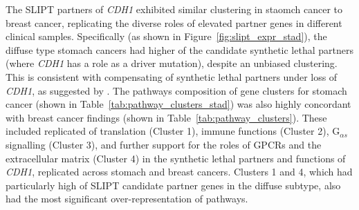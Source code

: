 The \gls{SLIPT} partners of \textit{CDH1} exhibited similar clustering in staomch cancer to breast cancer, replicating the diverse roles of elevated partner genes in different clinical samples. Specifically (as shown in Figure~\ref{fig:slipt_expr_stad}), the diffuse type stomach cancers had higher  of the candidate \gls{synthetic lethal} partners (where \textit{CDH1} has a role as a \gls{driver mutation}), despite an unbiased clustering. This is consistent with compensating  of \gls{synthetic lethal} partners under loss of \textit{CDH1}, as suggested by \citet{Lu2015}. The \glspl{pathway} composition of gene clusters for stomach cancer (shown in Table~\ref{tab:pathway_clusters_stad}) was also highly concordant with breast cancer findings (shown in Table~\ref{tab:pathway_clusters}). These included replicated of translation (Cluster 1), immune functions (Cluster 2), G$_{\alpha s}$ signalling (Cluster 3), and further support for the roles of \glspl{GPCR} and the extracellular matrix (Cluster 4) in the \gls{synthetic lethal} partners and functions of \textit{CDH1}, replicated across stomach and breast cancers. Clusters 1 and 4, which had particularly high  of \gls{SLIPT} candidate partner genes in the diffuse subtype, also had the most significant over-representation of \glspl{pathway}.

\FloatBarrier



